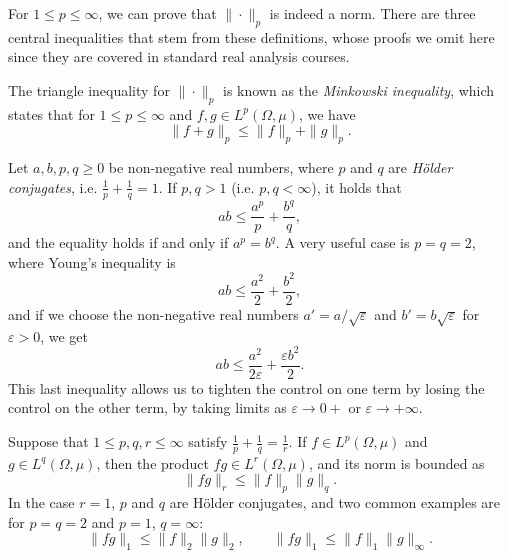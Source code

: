 For $1\leq p\leq \infty$, we can prove that $\|\cdot\|_p$ is indeed a norm. There are three central inequalities that stem from these definitions, whose proofs we omit here since they are covered in standard real analysis courses. 
\begin{theorem}
    The triangle inequality for $\|\cdot\|_p$ is known as the \emph{Minkowski inequality}, which states that for $1\leq p\leq \infty$ and $f,g\in L^p(\Omega,\mu)$, we have
    \begin{equation}
        \|f+g\|_p \leq \|f\|_p + \|g\|_p.
    \end{equation}
\end{theorem}
\begin{theorem}\label{thm:young-inequality}
    Let $a,b,p,q\geq 0$ be non-negative real numbers, where $p$ and $q$ are \emph{Hölder conjugates}, i.e. $\frac{1}{p}+\frac{1}{q}=1$. If $p,q>1$ (i.e. $p,q<\infty$), it holds that 
    \begin{equation}
        ab\leq \frac{a^p}{p} + \frac{b^q}{q},
    \end{equation}
    and the equality holds if and only if $a^p=b^q$. A very useful case is $p=q=2$, where Young's inequality is 
    \begin{equation}
        ab\leq \frac{a^2}{2}+\frac{b^2}{2},
    \end{equation}
    and if we choose the non-negative real numbers $a'=a/\sqrt{\varepsilon}$ and $b'=b\sqrt{\varepsilon}$ for $\varepsilon>0$, we get
    \begin{equation}
        ab\leq \frac{a^2}{2\varepsilon} + \frac{\varepsilon b^2}{2}.
    \end{equation}
    This last inequality allows us to tighten the control on one term by losing the control on the other term, by taking limits as $\varepsilon\to 0+$ or $\varepsilon\to+\infty$. 
\end{theorem}
\begin{theorem}
    Suppose that $1\leq p,q,r\leq \infty$ satisfy $\frac{1}{p}+\frac{1}{q}=\frac{1}{r}$. If $f\in L^p(\Omega,\mu)$ and $g\in L^q(\Omega,\mu)$, then the product $fg\in L^r(\Omega,\mu)$, and its norm is bounded as 
    \begin{equation}
        \|fg\|_r \leq \|f\|_p\|g\|_q.
    \end{equation}
    In the case $r=1$, $p$ and $q$ are Hölder conjugates, and two common examples are for $p=q=2$ and $p=1$, $q=\infty$:
    \begin{equation*}
        \|fg\|_1 \leq \|f\|_2\|g\|_2,\qquad \|fg\|_1 \leq \|f\|_1\|g\|_\infty.
    \end{equation*}
\end{theorem}

